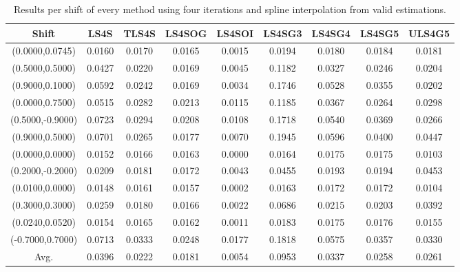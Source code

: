 \begin{table}[ht!]
\centering
\begin{tabular}{c|c|c|c|c|c|c|c|c}
Shift & \scriptsize{LS4S} & \scriptsize{TLS4S} & \scriptsize{LS4SOG} & \scriptsize{LS4SOI} & \scriptsize{LS4SG3} & \scriptsize{LS4SG4} & \scriptsize{LS4SG5} & \scriptsize{ULS4G5}\\ \hline 
(0.0000,0.0745) & 0.0160 & 0.0170 & 0.0165 & 0.0015 & 0.0194 & 0.0180 & 0.0184 & 0.0181 \\ \hline
(0.5000,0.5000) & 0.0427 & 0.0220 & 0.0169 & 0.0045 & 0.1182 & 0.0327 & 0.0246 & 0.0204 \\ \hline
(0.9000,0.1000) & 0.0592 & 0.0242 & 0.0169 & 0.0034 & 0.1746 & 0.0528 & 0.0355 & 0.0202 \\ \hline
(0.0000,0.7500) & 0.0515 & 0.0282 & 0.0213 & 0.0115 & 0.1185 & 0.0367 & 0.0264 & 0.0298 \\ \hline
(0.5000,-0.9000) & 0.0723 & 0.0294 & 0.0208 & 0.0108 & 0.1718 & 0.0540 & 0.0369 & 0.0266 \\ \hline
(0.9000,0.5000) & 0.0701 & 0.0265 & 0.0177 & 0.0070 & 0.1945 & 0.0596 & 0.0400 & 0.0447 \\ \hline
(0.0000,0.0000) & 0.0152 & 0.0166 & 0.0163 & 0.0000 & 0.0164 & 0.0175 & 0.0175 & 0.0103 \\ \hline
(0.2000,-0.2000) & 0.0209 & 0.0181 & 0.0172 & 0.0043 & 0.0455 & 0.0193 & 0.0194 & 0.0453 \\ \hline
(0.0100,0.0000) & 0.0148 & 0.0161 & 0.0157 & 0.0002 & 0.0163 & 0.0172 & 0.0172 & 0.0104 \\ \hline
(0.3000,0.3000) & 0.0259 & 0.0180 & 0.0166 & 0.0022 & 0.0686 & 0.0215 & 0.0203 & 0.0392 \\ \hline
(0.0240,0.0520) & 0.0154 & 0.0165 & 0.0162 & 0.0011 & 0.0183 & 0.0175 & 0.0176 & 0.0155 \\ \hline
(-0.7000,0.7000) & 0.0713 & 0.0333 & 0.0248 & 0.0177 & 0.1818 & 0.0575 & 0.0357 & 0.0330 \\ \hline
Avg.  & 0.0396 & 0.0222 & 0.0181 & 0.0054 & 0.0953 & 0.0337 & 0.0258 & 0.0261 \\ \hline
\end{tabular}
\caption{Results per shift of every method using four iterations and spline interpolation from valid estimations.}
\label{tab:4itSperShiftValid}
\end{table}


